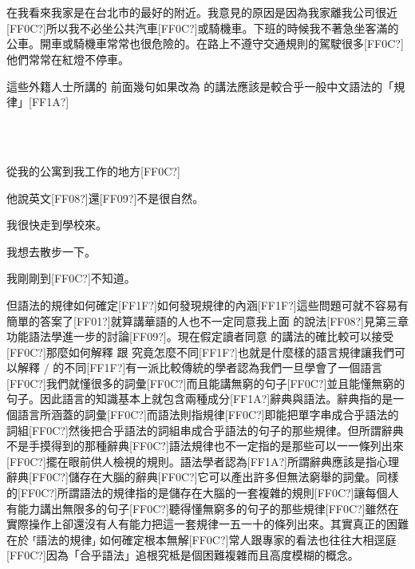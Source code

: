 \ea%
\label{ex:key:10}
\gll\\
\\
\glt
\z

在我看來我家是在台北市的最好的附近。我意見的原因是因為我家離我公司很近[FF0C?]所以我不必坐公共汽車[FF0C?]或騎機車。下班的時候我不著急坐客滿的公車。開車或騎機車常常也很危險的。在路上不遵守交通規則的駕駛很多[FF0C?]他們常常在紅燈不停車。

這些外籍人士所講的  前面幾句如果改為  的講法應該是較合乎一般中文語法的「規律」[FF1A?]

\ea%
\label{ex:key:11}
\gll\\
\\
\glt
\z

從我的公寓到我工作的地方[FF0C?]

他說英文[FF08?]還[FF09?]不是很自然。

我很快走到學校來。

我想去散步一下。

我剛剛到[FF0C?]不知道。

但語法的規律如何確定[FF1F?]如何發現規律的內涵[FF1F?]這些問題可就不容易有簡單的答案了[FF01?]就算講華語的人也不一定同意我上面  的說法[FF08?]見第三章功能語法學進一步的討論[FF09?]。現在假定讀者同意  的講法的確比較可以接受[FF0C?]那麼如何解釋  跟  究竟怎麼不同[FF1F?]也就是什麼樣的語言規律讓我們可以解釋 /  的不同[FF1F?]有一派比較傳統的學者認為我們一旦學會了一個語言[FF0C?]我們就懂很多的詞彙[FF0C?]而且能講無窮的句子[FF0C?]並且能懂無窮的句子。因此語言的知識基本上就包含兩種成分[FF1A?]辭典與語法。辭典指的是一個語言所涵蓋的詞彙[FF0C?]而語法則指規律[FF0C?]即能把單字串成合乎語法的詞組[FF0C?]然後把合乎語法的詞組串成合乎語法的句子的那些規律。但所謂辭典不是手摸得到的那種辭典[FF0C?]語法規律也不一定指的是那些可以一一條列出來[FF0C?]擺在眼前供人檢視的規則。語法學者認為[FF1A?]所謂辭典應該是指心理辭典[FF0C?]儲存在大腦的辭典[FF0C?]它可以產出許多但無法窮舉的詞彙。同樣的[FF0C?]所謂語法的規律指的是儲存在大腦的一套複雜的規則[FF0C?]讓每個人有能力講出無限多的句子[FF0C?]聽得懂無窮多的句子的那些規律[FF0C?]雖然在實際操作上卻還沒有人有能力把這一套規律一五一十的條列出來。其實真正的困難在於 ⸢語法的規律⸥ 如何確定根本無解[FF0C?]常人跟專家的看法也往往大相逕庭[FF0C?]因為「合乎語法」追根究柢是個困難複雜而且高度模糊的概念。

